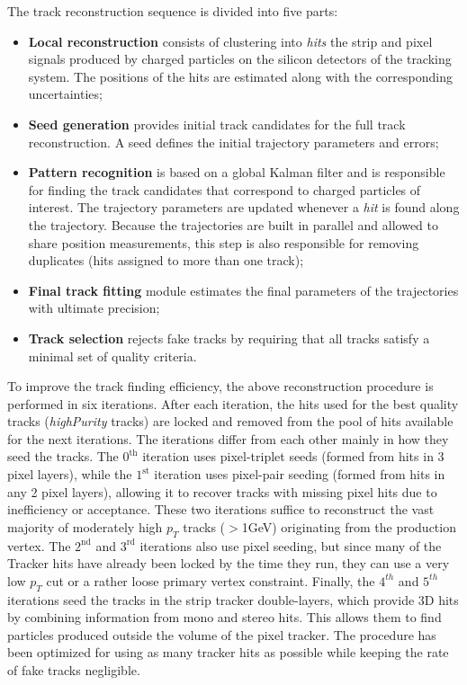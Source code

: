 The track reconstruction sequence is divided into five parts:
\begin{itemize}
\item \textbf{Local reconstruction} consists of clustering into \textit{hits}
the strip and pixel signals produced by charged particles on the silicon
detectors of the tracking system. The positions of the hits are estimated along
with the corresponding uncertainties;
\item \textbf{Seed generation} provides initial track candidates for the full
track reconstruction. A seed defines the initial trajectory parameters and errors;
\item \textbf{Pattern recognition} is based on a global Kalman filter \cite{Fruhwirth:1987fm}
 and
is responsible for finding the track candidates that correspond to charged
particles of interest. The trajectory parameters are updated whenever a \textit{hit} is found
along the trajectory. Because the trajectories are built in parallel and allowed to share position
measurements, this step is also responsible for removing duplicates (hits assigned to more than one track);
\item \textbf{Final track fitting} module estimates the final parameters of the trajectories
with ultimate precision;
\item \textbf{Track selection} rejects fake tracks by requiring that 
all tracks satisfy a minimal set of quality criteria.
\end{itemize}

To improve the track finding efficiency, the above reconstruction procedure is
performed in six iterations. After each iteration, the hits
used for the best quality tracks (\textit{highPurity} tracks) are
locked and removed from the pool of hits available for the next iterations.
The iterations differ from each other mainly in how they
seed the tracks.
 The $0^\mathrm{th}$ iteration uses pixel-triplet seeds (formed from
hits in 3 pixel layers), while the $1^\mathrm{st}$ iteration uses pixel-pair seeding
(formed from hits in any 2 pixel layers), allowing it to recover tracks with
missing pixel hits due to inefficiency or acceptance. These two iterations
suffice to reconstruct the vast majority of moderately high $p_T$ tracks ($>$1GeV)
originating from the production vertex. The $2^\mathrm{nd}$ and $3^\mathrm{rd}$ iterations
also use pixel seeding, but since many of the Tracker hits have already been
locked by the time they run, they can use a very low $p_T$ cut or a rather
loose primary vertex constraint. Finally, the $4^{th}$ and $5^{th}$
iterations seed the tracks in the strip tracker double-layers, which provide 3D
hits by combining information from mono and stereo hits. This allows them to
find particles produced outside the volume of the pixel tracker. The procedure has been optimized for using as
many tracker hits as possible while keeping the rate of fake tracks negligible.

